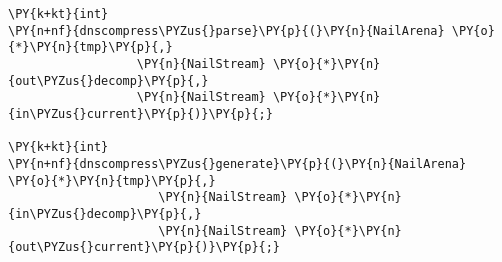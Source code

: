 \begin{Verbatim}[commandchars=\\\{\},codes={\catcode`\$=3\catcode`\^=7\catcode`\_=8}]
\PY{k+kt}{int}
\PY{n+nf}{dnscompress\PYZus{}parse}\PY{p}{(}\PY{n}{NailArena} \PY{o}{*}\PY{n}{tmp}\PY{p}{,}
                  \PY{n}{NailStream} \PY{o}{*}\PY{n}{out\PYZus{}decomp}\PY{p}{,}
                  \PY{n}{NailStream} \PY{o}{*}\PY{n}{in\PYZus{}current}\PY{p}{)}\PY{p}{;}

\PY{k+kt}{int}
\PY{n+nf}{dnscompress\PYZus{}generate}\PY{p}{(}\PY{n}{NailArena} \PY{o}{*}\PY{n}{tmp}\PY{p}{,}
                     \PY{n}{NailStream} \PY{o}{*}\PY{n}{in\PYZus{}decomp}\PY{p}{,}
                     \PY{n}{NailStream} \PY{o}{*}\PY{n}{out\PYZus{}current}\PY{p}{)}\PY{p}{;}
\end{Verbatim}
